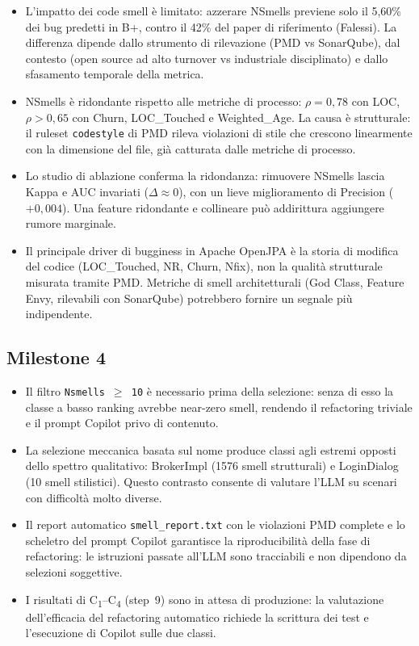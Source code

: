 \begin{itemize}
    \item L'impatto dei code smell è limitato: azzerare NSmells previene solo il 5,60\%
    dei bug predetti in B+, contro il 42\% del paper di riferimento (Falessi). La
    differenza dipende dallo strumento di rilevazione (PMD vs SonarQube), dal contesto
    (open source ad alto turnover vs industriale disciplinato) e dallo sfasamento temporale
    della metrica.

    \item NSmells è ridondante rispetto alle metriche di processo: $\rho = 0{,}78$ con LOC,
    $\rho > 0{,}65$ con Churn, LOC\_Touched e Weighted\_Age. La causa è strutturale:
    il ruleset \texttt{codestyle} di PMD rileva violazioni di stile che crescono linearmente
    con la dimensione del file, già catturata dalle metriche di processo.

    \item Lo studio di ablazione conferma la ridondanza: rimuovere NSmells lascia Kappa e
    AUC invariati ($\Delta \approx 0$), con un lieve miglioramento di Precision ($+0{,}004$).
    Una feature ridondante e collineare può addirittura aggiungere rumore marginale.

    \item Il principale driver di bugginess in Apache OpenJPA è la storia di modifica del
    codice (LOC\_Touched, NR, Churn, Nfix), non la qualità strutturale misurata tramite PMD.
    Metriche di smell architetturali (God Class, Feature Envy, rilevabili con SonarQube)
    potrebbero fornire un segnale più indipendente.
\end{itemize}

\subsection{Milestone 4}

\begin{itemize}
    \item Il filtro \texttt{Nsmells $\geq$ 10} è necessario prima della selezione:
    senza di esso la classe a basso ranking avrebbe near-zero smell, rendendo il
    refactoring triviale e il prompt Copilot privo di contenuto.

    \item La selezione meccanica basata sul nome produce classi agli estremi opposti dello
    spettro qualitativo: BrokerImpl (1576 smell strutturali) e LoginDialog (10 smell
    stilistici). Questo contrasto consente di valutare l'LLM su scenari con difficoltà
    molto diverse.

    \item Il report automatico \texttt{smell\_report.txt} con le violazioni PMD complete
    e lo scheletro del prompt Copilot garantisce la riproducibilità della fase di
    refactoring: le istruzioni passate all'LLM sono tracciabili e non dipendono da
    selezioni soggettive.

    \item I risultati di C\textsubscript{1}--C\textsubscript{4} (step~9) sono in attesa
    di produzione: la valutazione dell'efficacia del refactoring automatico richiede
    la scrittura dei test e l'esecuzione di Copilot sulle due classi.
\end{itemize}
